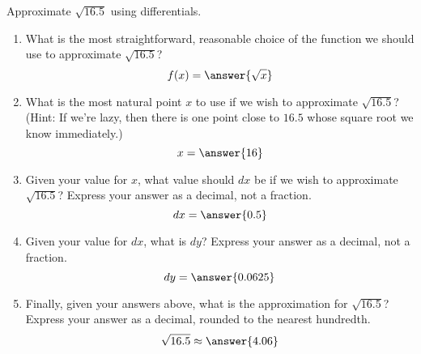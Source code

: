\documentclass{ximera}
\author{Gregory Hartman \and Matthew Carr}
\begin{document}
\begin{exercise}




Approximate $\sqrt{16.5}$ using differentials.
\begin{enumerate}
\item		What is the most straightforward, reasonable choice of the function we should use to approximate $\sqrt{16.5}$?\[f(x)=\answer{\sqrt{x}}\]
\item		What is the most natural point $x$ to use if we wish to approximate $\sqrt{16.5}$? (Hint: If we're lazy, then there is one point close to $16.5$ whose square root we know immediately.) \[x=\answer{16}\]
\item		Given your value for $x$, what value should $dx$ be if we wish to approximate $\sqrt{16.5}$? Express your answer as a decimal, not a fraction. \[dx=\answer{0.5}\]
\item		Given your value for $dx$, what is $dy$? Express your answer as a decimal, not a fraction. \[dy=\answer{0.0625}\]
\item		Finally, given your answers above, what is the approximation for $\sqrt{16.5}$? Express your answer as a decimal, rounded to the nearest hundredth. \[\sqrt{16.5}\approx\answer{4.06}\]
\end{enumerate}


\end{exercise}
\end{document}
